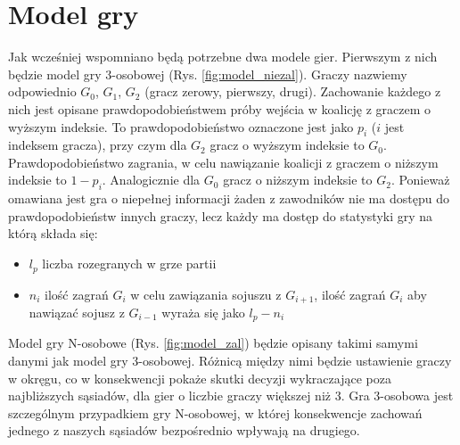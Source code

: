 \section{Model gry}
\label{sec:model}
Jak wcześniej wspomniano będą potrzebne dwa modele gier. Pierwszym z nich będzie model gry 3-osobowej (Rys. \ref{fig:model_niezal}). Graczy nazwiemy odpowiednio $G_0$, $G_1$, $G_2$ (gracz zerowy, pierwszy, drugi). Zachowanie każdego z nich jest opisane prawdopodobieństwem próby wejścia w koalicję z graczem o wyższym indeksie. To prawdopodobieństwo oznaczone jest jako $p_i$ ($i$ jest indeksem gracza), przy czym dla $G_2$ gracz o wyższym indeksie to $G_0$. Prawdopodobieństwo zagrania, w celu nawiązanie koalicji z graczem o niższym indeksie to $1 - p_i$. Analogicznie dla $G_0$ gracz o niższym indeksie to $G_2$. Ponieważ omawiana jest gra o niepełnej informacji żaden z zawodników nie ma dostępu do prawdopodobieństw innych graczy, lecz każdy ma dostęp do statystyki gry na którą składa się:
\begin{itemize}
\item $l_p$ liczba rozegranych w grze partii
\item $n_i$ ilość zagrań $G_i$ w celu zawiązania sojuszu z $G_{i+1}$, ilość zagrań $G_{i}$ aby nawiązać sojusz z $G_{i-1}$ wyraża się jako $l_p - n_i$
\end{itemize}
Model gry N-osobowe (Rys. \ref{fig:model_zal}) będzie opisany takimi samymi danymi jak model gry 3-osobowej. Różnicą między nimi będzie ustawienie graczy w okręgu, co w konsekwencji pokaże skutki decyzji wykraczające poza najbliższych sąsiadów, dla gier o liczbie graczy większej niż 3. Gra 3-osobowa jest szczególnym przypadkiem gry N-osobowej, w której konsekwencje zachowań jednego z naszych sąsiadów bezpośrednio wpływają na drugiego.
